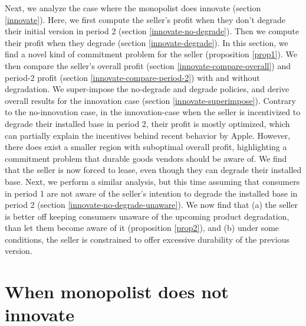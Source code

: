 \documentclass[isre,blindrev]{informs3} %
\begin{document}
Next, we analyze the case where the monopolist does innovate (section \ref{innovate}). Here, we first compute the seller{'}s profit when they don{'}t degrade their initial version in period 2 (section \ref{innovate-no-degrade}). Then we compute their profit when they degrade (section \ref{innovate-degrade}). In this section, we find a novel kind of commitment problem for the seller (proposition \ref{prop1}). We then compare the seller's overall profit (section \ref{innovate-compare-overall}) and period-2 profit (section \ref{innovate-compare-period-2}) with and without degradation. We super-impose the no-degrade and degrade policies, and derive overall results for the innovation case (section \ref{innovate-superimpose}). Contrary to the no-innovation case, in the innovation-case when the seller is incentivized to degrade their installed base in period 2, their profit is mostly optimized, which can partially explain the incentives behind recent behavior by Apple. However, there does exist a smaller region with suboptimal overall profit, highlighting a commitment problem that durable goods vendors should be aware of. We find that the seller is now forced to lease, even though they can degrade their installed base. Next, we perform a similar analysis, but this time assuming that consumers in period 1 are not aware of the seller's intention to degrade the installed base in period 2 (section \ref{innovate-no-degrade-unaware}). We now find that (a) the seller is better off keeping consumers unaware of the upcoming product degradation, than let them become aware of it (proposition \ref{prop2}), and (b) under some conditions, the seller is constrained to offer excessive durability of the previous version.


\section{When monopolist does not innovate}\label{no-innovate}
\end{document}
